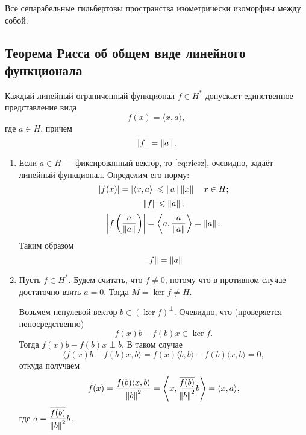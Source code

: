\begin{corollaryth}
    \indent Все сепарабельные гильбертовы пространства изометрически изоморфны между собой.
\end{corollaryth}

\subsection[Теорема Рисса]{Теорема Рисса об общем виде линейного функционала}
\begin{theorem}
    Каждый линейный ограниченный функционал $f \in H^*$ допускает единственное 
    представление вида
    \begin{equation}\label{eq:riesz}
        f(x) = \langle x, a \rangle,
    \end{equation}
    где $a \in H$, причем
    \[ \left\|f\right\| = \left\|a\right\|. \]
\end{theorem}

\begin{proofbreak}
\begin{enumerate}
    \item Если $a \in H$ --- фиксированный вектор, то \eqref{eq:riesz}, очевидно, задаёт линейный
        функционал. Определим его норму:
            \[ \left|f(x)\right| = \left|\langle x, a \rangle\right| \leqslant \left\|a\right\|\left\|x\right\| \quad x \in H; \]
            \[ \left\|f\right\| \leqslant \left\|a\right\|; \]
            \[ \left|f\left(\frac{a}{\left\|a\right\|}\right)\right| 
                = \left\langle a, \frac{a}{\left\|a\right\|} \right\rangle = \left\|a\right\|. \]
        Таким образом
        \[ \left\|f\right\| = \left\|a\right\| \]
    \item Пусть $f \in H^*$. Будем считать, что $f \neq 0$, потому что в противном случае
        достаточно взять $a = 0$. Тогда $M = \ker f \neq H$.

        Возьмем ненулевой вектор $b \in (\ker f)^\perp$. Очевидно, что (проверяется непосредственно)
        \[ f(x)b - f(b)x \in \ker f. \]
        Тогда $f(x)b - f(b)x \perp b$. В таком случае
        \[ \langle f(x)b - f(b) x, b \rangle = f(x) \langle b, b \rangle - 
            f(b) \langle x, b \rangle = 0, \]
        откуда получаем
        \[ f(x) = \frac{f(b)\langle x, b \rangle}{\left\|b\right\|^2} 
            = \left\langle x, \frac{\overline{f(b)}}{\left\|b\right\|^2}b \right\rangle 
                = \langle x, a \rangle, \]
        где $a = \displaystyle\frac{\overline{f(b)}}{\left\|b\right\|^2}b$.
\end{enumerate}
\end{proofbreak}
